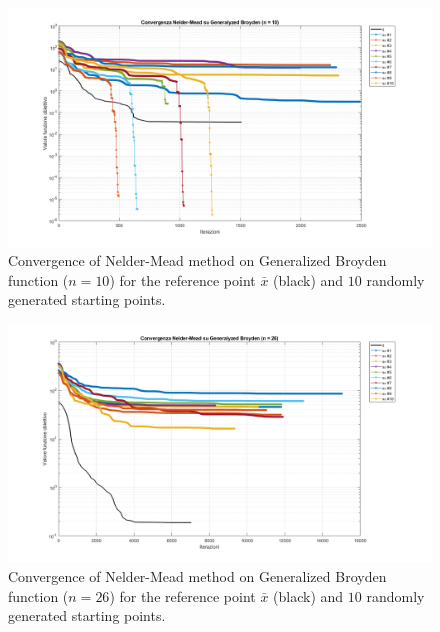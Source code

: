 \documentclass[a4paper,12pt]{article}
\begin{document}
	\begin{figure}[H]%
		\centering
		\includegraphics[width=\textwidth]{../immagini/broyden_10.png}
		\caption{Convergence of Nelder-Mead method on Generalized Broyden function ($n=10$) for the reference point $\bar{x}$ (black) and $10$ randomly generated starting points.}
		\label{fig:gb_nelder_10}
	\end{figure}
	\newpage
	\begin{figure}[H]%
		\centering
		\includegraphics[width=\textwidth]{../immagini/broyden_26.png}
		\caption{Convergence of Nelder-Mead method on Generalized Broyden function ($n=26$) for the reference point $\bar{x}$ (black) and $10$ randomly generated starting points.}
		\label{fig:gb_nelder_26}
	\end{figure}
	
\end{document}
